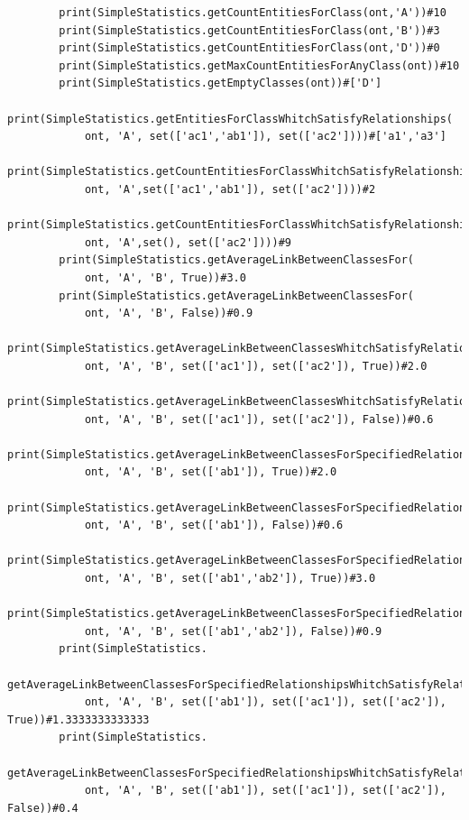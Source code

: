 \documentclass{article}
\begin{document}
\begin{verbatim}
		print(SimpleStatistics.getCountEntitiesForClass(ont,'A'))#10
		print(SimpleStatistics.getCountEntitiesForClass(ont,'B'))#3
		print(SimpleStatistics.getCountEntitiesForClass(ont,'D'))#0
		print(SimpleStatistics.getMaxCountEntitiesForAnyClass(ont))#10
		print(SimpleStatistics.getEmptyClasses(ont))#['D']
		print(SimpleStatistics.getEntitiesForClassWhitchSatisfyRelationships(
		    ont, 'A', set(['ac1','ab1']), set(['ac2'])))#['a1','a3']
		print(SimpleStatistics.getCountEntitiesForClassWhitchSatisfyRelationships(
		    ont, 'A',set(['ac1','ab1']), set(['ac2'])))#2
		print(SimpleStatistics.getCountEntitiesForClassWhitchSatisfyRelationships(
		    ont, 'A',set(), set(['ac2'])))#9
		print(SimpleStatistics.getAverageLinkBetweenClassesFor(
		    ont, 'A', 'B', True))#3.0
		print(SimpleStatistics.getAverageLinkBetweenClassesFor(
		    ont, 'A', 'B', False))#0.9
		print(SimpleStatistics.getAverageLinkBetweenClassesWhitchSatisfyRelationships(
		    ont, 'A', 'B', set(['ac1']), set(['ac2']), True))#2.0
		print(SimpleStatistics.getAverageLinkBetweenClassesWhitchSatisfyRelationships(
		    ont, 'A', 'B', set(['ac1']), set(['ac2']), False))#0.6
		print(SimpleStatistics.getAverageLinkBetweenClassesForSpecifiedRelationships(
		    ont, 'A', 'B', set(['ab1']), True))#2.0
		print(SimpleStatistics.getAverageLinkBetweenClassesForSpecifiedRelationships(
		    ont, 'A', 'B', set(['ab1']), False))#0.6
		print(SimpleStatistics.getAverageLinkBetweenClassesForSpecifiedRelationships(
		    ont, 'A', 'B', set(['ab1','ab2']), True))#3.0
		print(SimpleStatistics.getAverageLinkBetweenClassesForSpecifiedRelationships(
		    ont, 'A', 'B', set(['ab1','ab2']), False))#0.9
		print(SimpleStatistics.
		    getAverageLinkBetweenClassesForSpecifiedRelationshipsWhitchSatisfyRelationships(
		    ont, 'A', 'B', set(['ab1']), set(['ac1']), set(['ac2']), True))#1.3333333333333
		print(SimpleStatistics.
		    getAverageLinkBetweenClassesForSpecifiedRelationshipsWhitchSatisfyRelationships(
		    ont, 'A', 'B', set(['ab1']), set(['ac1']), set(['ac2']), False))#0.4
	\end{verbatim}
	\large
\end{document}

